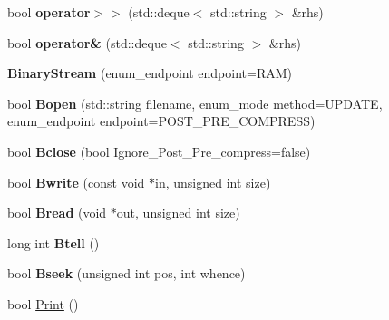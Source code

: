 \begin{DoxyCompactItemize}
\item 
\hypertarget{classBinaryStream_a13827a06ad9d0321a30c8e4a460aefd1}{bool {\bfseries operator$>$$>$} (std\-::deque$<$ std\-::string $>$ \&rhs)}\label{classBinaryStream_a13827a06ad9d0321a30c8e4a460aefd1}

\item 
\hypertarget{classBinaryStream_a80b6b47ffd83d312c343556b9c52f0b8}{bool {\bfseries operator\&} (std\-::deque$<$ std\-::string $>$ \&rhs)}\label{classBinaryStream_a80b6b47ffd83d312c343556b9c52f0b8}

\item 
\hypertarget{classBinaryStream_af65088798a6f0808f30f906e59902007}{{\bfseries Binary\-Stream} (enum\-\_\-endpoint endpoint=R\-A\-M)}\label{classBinaryStream_af65088798a6f0808f30f906e59902007}

\item 
\hypertarget{classBinaryStream_a275275e82cf87833f1f1b053d65774f2}{bool {\bfseries Bopen} (std\-::string filename, enum\-\_\-mode method=U\-P\-D\-A\-T\-E, enum\-\_\-endpoint endpoint=P\-O\-S\-T\-\_\-\-P\-R\-E\-\_\-\-C\-O\-M\-P\-R\-E\-S\-S)}\label{classBinaryStream_a275275e82cf87833f1f1b053d65774f2}

\item 
\hypertarget{classBinaryStream_a05975e038070b0fc7796c807bf42813d}{bool {\bfseries Bclose} (bool Ignore\-\_\-\-Post\-\_\-\-Pre\-\_\-compress=false)}\label{classBinaryStream_a05975e038070b0fc7796c807bf42813d}

\item 
\hypertarget{classBinaryStream_a7fde80b6a974f1eb31e89fb5b36a90ab}{bool {\bfseries Bwrite} (const void $\ast$in, unsigned int size)}\label{classBinaryStream_a7fde80b6a974f1eb31e89fb5b36a90ab}

\item 
\hypertarget{classBinaryStream_aed80ea557babddcc56c6b22ad58cbd3b}{bool {\bfseries Bread} (void $\ast$out, unsigned int size)}\label{classBinaryStream_aed80ea557babddcc56c6b22ad58cbd3b}

\item 
\hypertarget{classBinaryStream_ae2074057343fbfadb32ef74a444bf226}{long int {\bfseries Btell} ()}\label{classBinaryStream_ae2074057343fbfadb32ef74a444bf226}

\item 
\hypertarget{classBinaryStream_a9f4620b1b7d964bd4ef41bf7afbc7c84}{bool {\bfseries Bseek} (unsigned int pos, int whence)}\label{classBinaryStream_a9f4620b1b7d964bd4ef41bf7afbc7c84}

\item 
\hypertarget{classBinaryStream_a87160fadec72bf15857bd995134b2109}{bool \hyperlink{classBinaryStream_a87160fadec72bf15857bd995134b2109}{Print} ()}\label{classBinaryStream_a87160fadec72bf15857bd995134b2109}


\end{DoxyCompactItemize}
